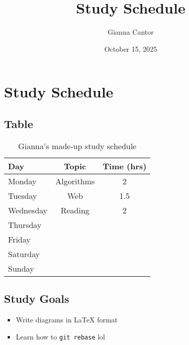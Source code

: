 \documentclass{article}
\title{Study Schedule}
\author{Gianna Cantor}
\date{October 15, 2025}
\begin{document}
\maketitle

\section{Study Schedule}
\subsection{Table}
\begin{table}[h!]
    \centering
    \begin{tabular}{l c c}
         \hline
    Day & Topic & Time (hrs) \\
    \hline
    \hline
    Monday & Algorithms & 2 \\
    Tuesday & Web & 1.5 \\
    Wednesday & Reading & 2 \\
    Thursday & \text{---} & \text{---} \\
    Friday & \text{---} & \text{---} \\
    Saturday & \text{---} & \text{---} \\
    Sunday & \text{---} & \text{---}
    \end{tabular}
    \caption{Gianna's made-up study schedule}
    \label{tab:placeholder}
\end{table}

\subsection{Study Goals}
\begin{itemize}
    \item Write diagrams in LaTeX format
    \item Learn how to \texttt{git rebase} lol
\end{itemize}
\end{document}
